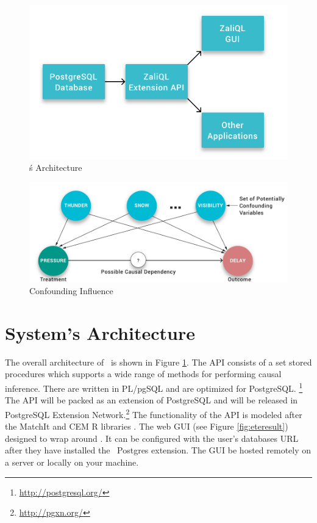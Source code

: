 
\begin{figure}
 \includegraphics[scale=0.25]{Figures/System-Overview.png}
 \caption{\GSQLB\'s Architecture}
  \label{fig:arch}
  \vspace{-3mm}
\end{figure}

\begin{figure}
\hspace*{.3cm}\includegraphics[scale=0.2]{figures/Scenario-Graph.png}
\caption{Confounding Influence}

\label{fig:cv}
\vspace{-0.3cm}
\end{figure}

\section{System's Architecture}

The overall architecture of \GSQL\ is shown in Figure \ref{fig:arch}.
The API consists of a set stored procedures which supports a wide range of methods for performing causal inference.  There are written in PL/pgSQL and are optimized for PostgreSQL. \footnote{\url{http://postgresql.org/}}
The API will be packed  as an extension of  PostgreSQL and will be released in 
PostgreSQL Extension Network.\footnote{\url{http://pgxn.org/}}
The functionality of the API is modeled after the MatchIt and CEM R libraries \cite{ho2005,iacus2009cem}. The web GUI (see Figure \ref{fig:eteresult}) designed to wrap around \GSQL. It can be configured with the user's databases URL after they have installed the \GSQL\ Postgres extension. The  GUI be hosted remotely on a server or locally on your machine. 
